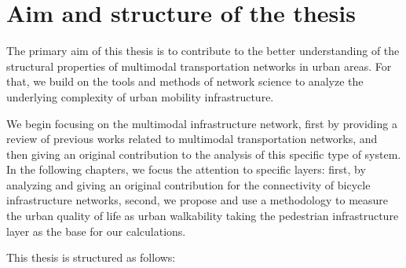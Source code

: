 
\section{Aim and structure of the thesis}

The primary aim of this thesis is to contribute to the better understanding of the structural properties of multimodal transportation networks in urban areas. For that, we build on the tools and methods of network science to analyze the underlying complexity of urban mobility infrastructure. 

We begin focusing on the multimodal infrastructure network, first by providing a review of previous works related to multimodal transportation networks, and then giving an original contribution to the analysis of this specific type of system. In the following chapters, we focus the attention to specific layers: first, by analyzing and giving an original contribution for the connectivity of bicycle infrastructure networks, second, we propose and use a methodology to measure the urban quality of life as urban walkability taking the pedestrian infrastructure layer as the base for our calculations.

This thesis is structured as follows:

